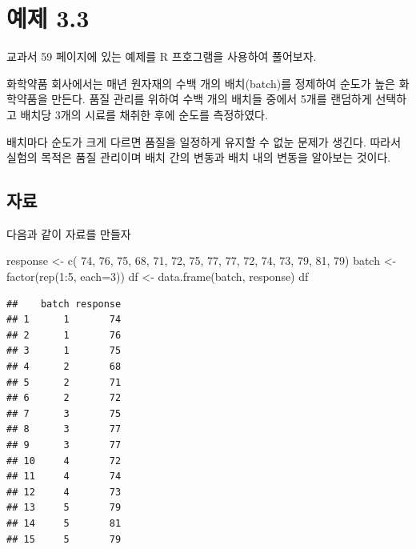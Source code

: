 \documentclass[
]{book}
\newenvironment{Shaded}{\begin{snugshade}}{\end{snugshade}}
\newcommand{\AttributeTok}[1]{\textcolor[rgb]{0.77,0.63,0.00}{#1}}
\newcommand{\DecValTok}[1]{\textcolor[rgb]{0.00,0.00,0.81}{#1}}
\newcommand{\FunctionTok}[1]{\textcolor[rgb]{0.00,0.00,0.00}{#1}}
\newcommand{\NormalTok}[1]{#1}
\newcommand{\OtherTok}[1]{\textcolor[rgb]{0.56,0.35,0.01}{#1}}
\newcommand{\SpecialCharTok}[1]{\textcolor[rgb]{0.00,0.00,0.00}{#1}}
\theoremstyle{definition}
\theoremstyle{definition}
\theoremstyle{definition}
\theoremstyle{remark}
\begin{document}
\hypertarget{example}{%
\chapter{예제 3.3}\label{example}}

교과서 59 페이지에 있는 예제를 R 프호그램을 사용하여 풀어보자.

화학약품 회사에서는 매년 원자재의 수백 개의 배치(batch)를 정제하여 순도가 높은 화학약품을 만든다. 품질 관리를 위하여 수백 개의 배치들 중에서 5개를 랜덤하게 선택하고 배치당 3개의 시료를 채취한 후에 순도를 측정하였다.

배치마다 순도가 크게 다르면 품질을 일정하게 유지할 수 없눈 문제가 생긴다. 따라서 실험의 목적은 품질 관리이며 배치 간의 변동과 배치 내의 변동을 알아보는 것이다.

\hypertarget{uxc790uxb8cc}{%
\section{자료}\label{uxc790uxb8cc}}

다음과 같이 자료를 만들자

\begin{Shaded}
\begin{Highlighting}[]
\NormalTok{response }\OtherTok{\textless{}{-}} \FunctionTok{c}\NormalTok{( }\DecValTok{74}\NormalTok{, }\DecValTok{76}\NormalTok{, }\DecValTok{75}\NormalTok{,}
               \DecValTok{68}\NormalTok{, }\DecValTok{71}\NormalTok{, }\DecValTok{72}\NormalTok{,}
               \DecValTok{75}\NormalTok{, }\DecValTok{77}\NormalTok{, }\DecValTok{77}\NormalTok{,}
               \DecValTok{72}\NormalTok{, }\DecValTok{74}\NormalTok{, }\DecValTok{73}\NormalTok{,}
               \DecValTok{79}\NormalTok{, }\DecValTok{81}\NormalTok{, }\DecValTok{79}\NormalTok{)}
\NormalTok{batch }\OtherTok{\textless{}{-}} \FunctionTok{factor}\NormalTok{(}\FunctionTok{rep}\NormalTok{(}\DecValTok{1}\SpecialCharTok{:}\DecValTok{5}\NormalTok{, }\AttributeTok{each=}\DecValTok{3}\NormalTok{))}
\NormalTok{df }\OtherTok{\textless{}{-}} \FunctionTok{data.frame}\NormalTok{(batch, response)}
\NormalTok{df}
\end{Highlighting}
\end{Shaded}

\begin{verbatim}
##    batch response
## 1      1       74
## 2      1       76
## 3      1       75
## 4      2       68
## 5      2       71
## 6      2       72
## 7      3       75
## 8      3       77
## 9      3       77
## 10     4       72
## 11     4       74
## 12     4       73
## 13     5       79
## 14     5       81
## 15     5       79
\end{verbatim}
\end{document}
